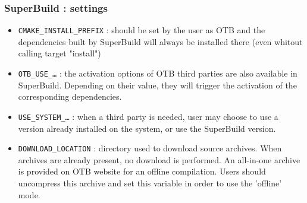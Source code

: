 \documentclass[8pt]{beamer}
\begin{document}
\begin{frame}
\frametitle{SuperBuild : settings}

\begin{itemize}
\item \texttt{CMAKE\_INSTALL\_PREFIX} : should be set by the user as OTB and the dependencies 
built by SuperBuild will always be installed there (even whitout calling target "install")  
\item \texttt{OTB\_USE\_\ldots} : the activation options of OTB third parties are also available 
in SuperBuild. Depending on their value, they will trigger the activation of the 
corresponding dependencies.
\item \texttt{USE\_SYSTEM\_\ldots} : when a third party is needed, user may choose to use a 
version already installed on the system, or use the SuperBuild version.
\item \texttt{DOWNLOAD\_LOCATION} : directory used to download source archives. When archives 
are already present, no download is performed. An all-in-one archive is provided 
on OTB website for an offline compilation. Users should uncompress this archive 
and set this variable in order to use the 'offline' mode.
\end{itemize}

\end{frame}
\end{document}
